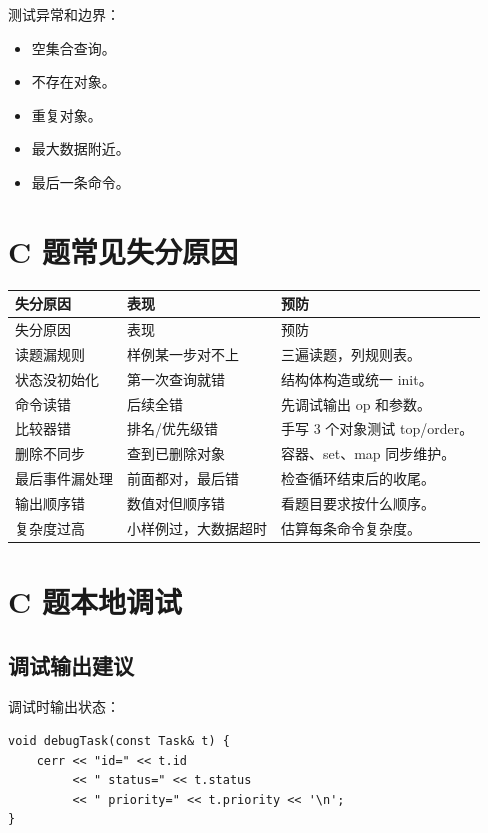 测试异常和边界：

\begin{itemize}
  \item 空集合查询。
  \item 不存在对象。
  \item 重复对象。
  \item 最大数据附近。
  \item 最后一条命令。
\end{itemize}

\section{C 题常见失分原因}\label{sec:07-33}

\begin{longtable}{p{4cm}p{5cm}p{5cm}}
\toprule
失分原因 & 表现 & 预防 \\
\midrule
\endfirsthead
\toprule
失分原因 & 表现 & 预防 \\
\midrule
\endhead
读题漏规则 & 样例某一步对不上 & 三遍读题，列规则表。 \\
状态没初始化 & 第一次查询就错 & 结构体构造或统一 init。 \\
命令读错 & 后续全错 & 先调试输出 op 和参数。 \\
比较器错 & 排名/优先级错 & 手写 3 个对象测试 top/order。 \\
删除不同步 & 查到已删除对象 & 容器、set、map 同步维护。 \\
最后事件漏处理 & 前面都对，最后错 & 检查循环结束后的收尾。 \\
输出顺序错 & 数值对但顺序错 & 看题目要求按什么顺序。 \\
复杂度过高 & 小样例过，大数据超时 & 估算每条命令复杂度。 \\
\bottomrule
\end{longtable}

\section{C 题本地调试}\label{sec:07-34}

\subsection{调试输出建议}

调试时输出状态：

\begin{lstlisting}
void debugTask(const Task& t) {
    cerr << "id=" << t.id
         << " status=" << t.status
         << " priority=" << t.priority << '\n';
}
\end{lstlisting}

